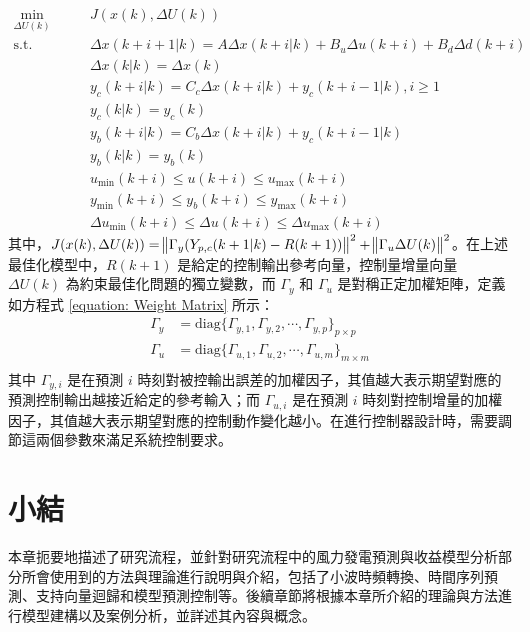 \begin{equation}\label{equation: MPC Programming Problem}
  \begin{aligned}
    \min_{\Delta U(k)} \qquad & J(x(k), \Delta U(k))                                                                 \\
    \text{s.t.}        \qquad & \Delta x(k+i+1 | k) = A\Delta x(k+i|k) + B_{u} \Delta u(k+i) + B_{d} \Delta d(k + i) \\
                              & \Delta x(k|k) = \Delta x(k)                                                          \\
                              & y_{c} (k+i|k) = C_{c} \Delta x(k+i|k) + y_{c} (k+i-1|k), i \geq 1                    \\
                              & y_{c} (k|k) = y_{c}(k)                                                               \\
                              & y_{b} (k+i|k) = C_{b} \Delta x(k+i|k) + y_{c} (k+i-1|k)                              \\
                              & y_{b} (k|k) = y_{b}(k)                                                               \\
                              & u_{\min} (k+i) \leq u(k+i) \leq u_{\max} (k+i)                                       \\
                              & y_{\min} (k+i) \leq y_{b}(k+i) \leq y_{\max} (k+i)                                   \\
                              & \Delta u_{\min} (k+i) \leq \Delta u(k+i) \leq \Delta u_{\max} (k+i)
  \end{aligned}
\end{equation}
%
其中，$J(x(k), \Delta U(k)) = \norm{\Gamma_{y} (Y_{p, c}(k+1|k)-R(k+1))}^2 + \norm{\Gamma_{u} \Delta U(k)}^2$。在上述最佳化模型中，$R(k+1)$ 是給定的控制輸出參考向量，控制量增量向量 $\Delta U(k)$ 為約束最佳化問題的獨立變數，而 $\Gamma_{y}$ 和 $\Gamma_{u}$ 是對稱正定加權矩陣，定義如方程式 \eqref{equation: Weight Matrix} 所示：
%
\begin{equation}\label{equation: Weight Matrix}
  \begin{aligned}
    \Gamma_{y} & = \text{diag} \{ \Gamma_{y, 1}, \Gamma_{y, 2}, \cdots, \Gamma_{y, p} \}_{p \times p} \\
    \Gamma_{u} & = \text{diag} \{ \Gamma_{u, 1}, \Gamma_{u, 2}, \cdots, \Gamma_{u, m} \}_{m \times m} \\
  \end{aligned}
\end{equation}
%
其中 $\Gamma_{y, i}$ 是在預測 $i$ 時刻對被控輸出誤差的加權因子，其值越大表示期望對應的預測控制輸出越接近給定的參考輸入；而 $\Gamma_{u, i}$ 是在預測 $i$ 時刻對控制增量的加權因子，其值越大表示期望對應的控制動作變化越小。在進行控制器設計時，需要調節這兩個參數來滿足系統控制要求。

\section{小結}

本章扼要地描述了研究流程，並針對研究流程中的風力發電預測與收益模型分析部分所會使用到的方法與理論進行說明與介紹，包括了小波時頻轉換、時間序列預測、支持向量迴歸和模型預測控制等。後續章節將根據本章所介紹的理論與方法進行模型建構以及案例分析，並詳述其內容與概念。
